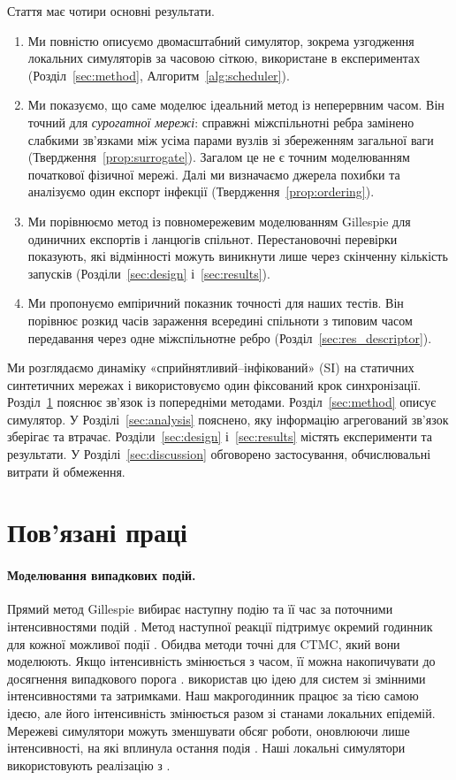 Стаття має чотири основні результати.
\begin{enumerate}
\item Ми повністю описуємо двомасштабний симулятор, зокрема узгодження локальних симуляторів за часовою сіткою, використане в експериментах (Розділ~\ref{sec:method}, Алгоритм~\ref{alg:scheduler}).
\item Ми показуємо, що саме моделює ідеальний метод із неперервним часом. Він точний для \emph{сурогатної мережі}: справжні міжспільнотні ребра замінено слабкими зв'язками між усіма парами вузлів зі збереженням загальної ваги (Твердження~\ref{prop:surrogate}). Загалом це не є точним моделюванням початкової фізичної мережі. Далі ми визначаємо джерела похибки та аналізуємо один експорт інфекції (Твердження~\ref{prop:ordering}).
\item Ми порівнюємо метод із повномережевим моделюванням Gillespie для одиничних експортів і ланцюгів спільнот. Перестановочні перевірки показують, які відмінності можуть виникнути лише через скінченну кількість запусків (Розділи~\ref{sec:design} і~\ref{sec:results}).
\item Ми пропонуємо емпіричний показник точності для наших тестів. Він порівнює розкид часів зараження всередині спільноти з типовим часом передавання через одне міжспільнотне ребро (Розділ~\ref{sec:res_descriptor}).
\end{enumerate}

Ми розглядаємо динаміку «сприйнятливий--інфікований» (SI) на статичних синтетичних мережах і використовуємо один фіксований крок синхронізації. Розділ~\ref{sec:related} пояснює зв'язок із попередніми методами. Розділ~\ref{sec:method} описує симулятор. У Розділі~\ref{sec:analysis} пояснено, яку інформацію агрегований зв'язок зберігає та втрачає. Розділи~\ref{sec:design} і~\ref{sec:results} містять експерименти та результати. У Розділі~\ref{sec:discussion} обговорено застосування, обчислювальні витрати й обмеження.

\clearpage
\section{Пов'язані праці}
\label{sec:related}

\paragraph{Моделювання випадкових подій.}
Прямий метод Gillespie вибирає наступну подію та її час за поточними інтенсивностями подій \citep{gillespie1977exact}. Метод наступної реакції підтримує окремий годинник для кожної можливої події \citep{gibson2000}. Обидва методи точні для CTMC, який вони моделюють. Якщо інтенсивність змінюється з часом, її можна накопичувати до досягнення випадкового порога \citep{ethier1986}. \citet{anderson2007} використав цю ідею для систем зі змінними інтенсивностями та затримками. Наш макрогодинник працює за тією самою ідеєю, але його інтенсивність змінюється разом зі станами локальних епідемій. Мережеві симулятори можуть зменшувати обсяг роботи, оновлюючи лише інтенсивності, на які вплинула остання подія \citep{vestergaard2015,kuryliak2025simulating}. Наші локальні симулятори використовують реалізацію з \citet{kuryliak2025simulating}.

